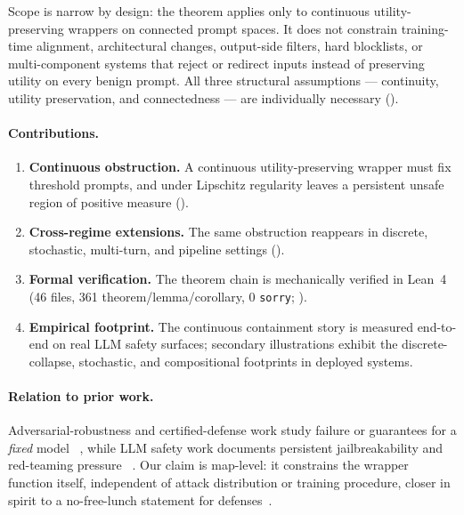 \documentclass[11pt]{article}
\begin{document}
Scope is narrow by design: the theorem applies only to continuous
utility-preserving wrappers on connected prompt spaces. It does not
constrain training-time alignment, architectural changes, output-side
filters, hard blocklists, or multi-component systems that reject or
redirect inputs instead of preserving utility on every benign prompt.
All three structural assumptions --- continuity, utility preservation,
and connectedness --- are individually necessary
().

\paragraph{Contributions.}
\begin{enumerate}[nosep]
  \item \textbf{Continuous obstruction.} A continuous utility-preserving
    wrapper must fix threshold prompts, and under Lipschitz regularity
    leaves a persistent unsafe region of positive measure
    ().
  \item \textbf{Cross-regime extensions.} The same obstruction
    reappears in discrete, stochastic, multi-turn, and pipeline
    settings ().
  \item \textbf{Formal verification.} The theorem chain is mechanically
    verified in Lean~4 (46 files, 361 theorem/lemma/corollary,
    0 \texttt{sorry}; ).
  \item \textbf{Empirical footprint.} The continuous containment story
    is measured end-to-end on real LLM safety surfaces; secondary
    illustrations exhibit the discrete-collapse, stochastic, and
    compositional footprints in deployed systems.
\end{enumerate}

\paragraph{Relation to prior work.}
Adversarial-robustness and certified-defense work study failure or
guarantees for a \emph{fixed} model
~\cite{szegedy2013intriguing,goodfellow2014explaining,carlini2017evaluating,madry2018towards,cohen2019certified,katz2017reluplex,singh2019abstract,huang2017safety,bagnall2019certifying},
while LLM safety work documents persistent jailbreakability and
red-teaming pressure
~\cite{zou2023universal,chao2024jailbreaking,mehrotra2024tree,greshake2023indirect,mouret2015illuminating,samvelyan2024rainbow}.
Our claim is map-level: it constrains the wrapper function itself,
independent of attack distribution or training procedure, closer in
spirit to a no-free-lunch statement for defenses~\cite{wolpert1997no}.
\end{document}
